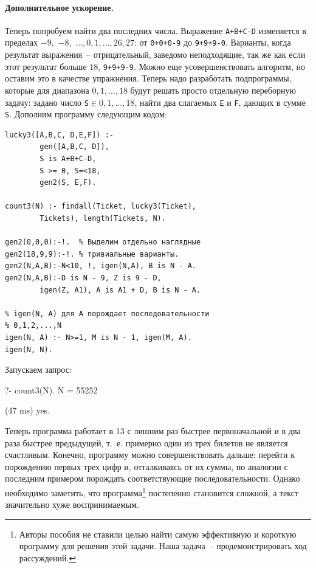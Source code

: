 \documentclass[a4paper,14pt, openany, twoside, final]{extbook} %
\begin{document}
\paragraph{Дополнительное ускорение.} Теперь попробуем найти два последних числа. Выражение \texttt{A+B+C-D} изменяется в пределах $-9,$ $-8,$ $\ldots,0,1,\ldots,26,27$: от \texttt{0+0+0-9} до \texttt{9+9+9-0}. Варианты, когда результат выражения~-- отрицательный, заведомо неподходящие, так же как если этот результат больше $18$, \texttt{9+9+9-9}. Можно еще усовершенствовать алгоритм, но оставим это в качестве упражнения. Теперь надо разработать подпрограммы, которые для диапазона $0,1,\ldots,18$ будут решать просто отдельную переборную задачу: задано число \texttt{S}$\in 0,1,\ldots,18$, найти два слагаемых \texttt{E} и \texttt{F}, дающих в сумме \texttt{S}. Дополним программу следующим кодом:

\begin{verbatim}
lucky3([A,B,C, D,E,F]) :-
        gen([A,B,C, D]),
        S is A+B+C-D,
        S >= 0, S=<18,
        gen2(S, E,F).

count3(N) :- findall(Ticket, lucky3(Ticket),
        Tickets), length(Tickets, N).

gen2(0,0,0):-!.  % Выделим отдельно наглядные
gen2(18,9,9):-!. % тривиальные варианты.
gen2(N,A,B):-N<10, !, igen(N,A), B is N - A.
gen2(N,A,B):-D is N - 9, Z is 9 - D,
        igen(Z, A1), A is A1 + D, B is N - A.

% igen(N, A) для A порождает последовательности
% 0,1,2,...,N
igen(N, A) :- N>=1, M is N - 1, igen(M, A).
igen(N, N).
\end{verbatim}

\noindent{}Запускаем запрос:

\begin{proexp}
?- count3(N).
N = 55252

(47 ms) yes.
\end{proexp}


Теперь программа работает в 13 с лишним раз быстрее первоначальной и в два раза быстрее предыдущей, т.~е. примерно один из трех билетов не является счастливым. Конечно, программу можно совершенствовать дальше: перейти к порождению первых трех цифр и, отталкиваясь от их суммы, по аналогии с последним примером порождать соответствующие последовательности. Однако необходимо заметить, что программа\footnote{Авторы пособия не ставили целью найти самую эффективную и короткую программу для решения этой задачи. Наша задача~-- продемонстрировать ход рассуждений.} постепенно становится сложной, а текст значительно хуже воспринимаемым. %
\end{document}
